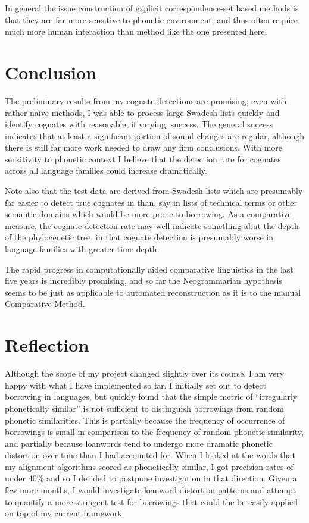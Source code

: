 \documentclass[doc,natbib,11pt]{apa6}
\begin{document}
In general the issue construction of explicit correspondence-set based methods is that they are far more sensitive to phonetic environment, and thus often require much more human interaction than method like the one presented here.
\section{Conclusion}

The preliminary results from my cognate detections are promising, even with rather naive methods, I was able to process large Swadesh lists quickly and identify cognates with reasonable, if varying, success. The general success indicates that at least a significant portion of sound changes are regular, although there is still far more work needed to draw any firm conclusions. With more sensitivity to phonetic context I believe that the detection rate for cognates across all language families could increase dramatically. 

Note also that the test data are derived from Swadesh lists which are presumably far easier to detect true cognates in than, say in lists of technical terms or other semantic domains which would be more prone to borrowing. As a comparative measure, the cognate detection rate may well indicate something abut the depth of the phylogenetic tree, in that cognate detection is presumably worse in language families with greater time depth. 

The rapid progress in computationally aided comparative linguistics in the last five years is incredibly promising, and so far the Neogrammarian hypothesis seems to be just as applicable to automated reconstruction as it is to the manual Comparative Method. 

\section{Reflection}

Although the scope of my project changed slightly over its course, I am very happy with what I have implemented so far. I initially set out to detect borrowing in languages, but quickly found that the simple metric of ``irregularly phonetically similar'' is not sufficient to distinguish borrowings from random phonetic similarities. This is partially because the frequency of occurrence of borrowings is small in comparison to the frequency of random phonetic similarity, and partially because loanwords tend to undergo more dramatic phonetic distortion over time than I had accounted for. When I looked at the words that my alignment algorithms scored as phonetically similar, I got precision rates of under 40\% and so I decided to postpone investigation in that direction. Given a few more months, I would investigate loanword distortion patterns and attempt to quantify a more stringent test for borrowings that could the be easily applied on top of my current framework. 
\end{document}
